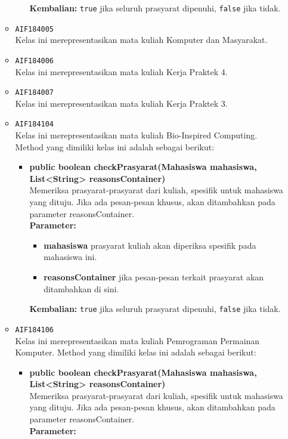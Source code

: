 \begin{enumerate}
\begin{itemize}
\begin{itemize}
\begin{itemize}
\end{itemize}
\textbf{Kembalian:} \texttt{true} jika seluruh prasyarat dipenuhi, \texttt{false} jika tidak.
\end{itemize}
\item \texttt{AIF184005} \\
Kelas ini merepresentasikan mata kuliah Komputer dan Masyarakat.
\item \texttt{AIF184006} \\
Kelas ini merepresentasikan mata kuliah Kerja Praktek 4.
\item \texttt{AIF184007} \\
Kelas ini merepresentasikan mata kuliah Kerja Praktek 3.
\item \texttt{AIF184104} \\
Kelas ini merepresentasikan mata kuliah Bio-Inspired Computing. Method yang dimiliki kelas ini adalah sebagai berikut: 
\begin{itemize}
\item \textbf{public boolean checkPrasyarat(Mahasiswa mahasiswa, List<String> reasonsContainer)}\\
Memeriksa prasyarat-prasyarat dari kuliah, spesifik untuk mahasiswa yang dituju. Jika ada pesan-pesan khusus, akan ditambahkan pada parameter reasonsContainer.\\
\textbf{Parameter:}
\begin{itemize}
\item \textbf{mahasiswa} prasyarat kuliah akan diperiksa spesifik pada mahasiswa ini.
\item \textbf{reasonsContainer} jika pesan-pesan terkait prasyarat akan ditambahkan di sini.
\end{itemize}
\textbf{Kembalian:} \texttt{true} jika seluruh prasyarat dipenuhi, \texttt{false} jika tidak.
\end{itemize}
\item \texttt{AIF184106} \\
Kelas ini merepresentasikan mata kuliah Pemrograman Permainan Komputer. Method yang dimiliki kelas ini adalah sebagai berikut: 
\begin{itemize}
\item \textbf{public boolean checkPrasyarat(Mahasiswa mahasiswa, List<String> reasonsContainer)}\\
Memeriksa prasyarat-prasyarat dari kuliah, spesifik untuk mahasiswa yang dituju. Jika ada pesan-pesan khusus, akan ditambahkan pada parameter reasonsContainer.\\
\textbf{Parameter:}

\end{itemize}
\end{itemize}
\end{enumerate}
